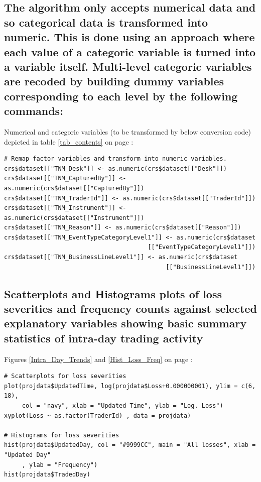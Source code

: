 \documentclass{DissertateUSU}
\begin{document}
\normalsize

\subsection{The algorithm only accepts numerical data and so categorical data is transformed into numeric. This is done using an approach where each value of a categoric variable is turned into a variable itself. Multi-level categoric variables are recoded by building dummy variables corresponding to each level by the following commands:}
\label{ssec:Transforming to dummy variables}

Numerical and categoric variables (to be transformed by below conversion
code) depicted in table \ref{tab_contents} on page
\pageref{tab_contents}:

\small

\begin{verbatim}
# Remap factor variables and transform into numeric variables.
crs$dataset[["TNM_Desk"]] <- as.numeric(crs$dataset[["Desk"]])
crs$dataset[["TNM_CapturedBy"]] <- as.numeric(crs$dataset[["CapturedBy"]])
crs$dataset[["TNM_TraderId"]] <- as.numeric(crs$dataset[["TraderId"]])
crs$dataset[["TNM_Instrument"]] <- as.numeric(crs$dataset[["Instrument"]])
crs$dataset[["TNM_Reason"]] <- as.numeric(crs$dataset[["Reason"]])
crs$dataset[["TNM_EventTypeCategoryLevel1"]] <- as.numeric(crs$dataset
                                        [["EventTypeCategoryLevel1"]])
crs$dataset[["TNM_BusinessLineLevel1"]] <- as.numeric(crs$dataset
                                             [["BusinessLineLevel1"]])
\end{verbatim}

\normalsize

\subsection{Scatterplots and Histograms plots of loss severities and frequency counts against selected explanatory variables showing basic
summary statistics of intra-day trading activity}
\label{ssec:Scatterplots and Histograms of intra-day trading activity}

Figures \ref{Intra_Day_Trends} and \ref{Hist_Loss_Freq} on page
\pageref{Hist_Loss_Freq}:

\small

\begin{verbatim}
# Scatterplots for loss severities
plot(projdata$UpdatedTime, log(projdata$Loss+0.000000001), ylim = c(6, 18),
     col = "navy", xlab = "Updated Time", ylab = "Log. Loss")
xyplot(Loss ~ as.factor(TraderId) , data = projdata)

# Histograms for loss severities
hist(projdata$UpdatedDay, col = "#9999CC", main = "All losses", xlab = "Updated Day"
     , ylab = "Frequency")
hist(projdata$TradedDay)
\end{verbatim}
\end{document}

